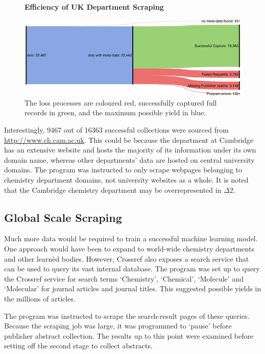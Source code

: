 \begin{figure}[H]
    \centering
    \textbf{Efficiency of UK Department Scraping}\par\medskip
    \includegraphics[width=\textwidth]{Data_Acquisition/uk_sankey.png}
    \caption[Efficiency of UK Department Scraping]{The loss processes are coloured red, successfully captured full records in green, and the maximum possible yield in blue.}
     \label{fig:UKSANK}
\end{figure}

Interestingly, 9467 out of 16363 successful collections were sourced from \url{http://www.ch.cam.ac.uk}. This could be because the department at Cambridge has an extensive website and  hosts the majority of its information under its own domain name, whereas other departments' data are hosted on central university domains. The program was instructed to only scrape webpages belonging to chemistry department domains, not university websites as a whole. It is noted that the Cambridge chemistry department may be overrepresented in $\Delta2$.

\subsection{Global Scale Scraping}
\label{sec:CROSSREFSCRAPE}
Much more data would be required to train a successful machine learning model. One approach would have been to expand to world-wide chemistry departments and other learn\`{e}d bodies. However, Crossref also exposes a search service that can be used to query its vast internal database. The program was set up to query the Crossref service for search terms `Chemistry', `Chemical', `Molecule' and `Molecular' for journal articles and journal titles. This suggested possible yields in the millions of articles. 

The program was instructed to scrape the search-result pages of these queries. Because the scraping job was large, it was programmed to `pause' before publisher abstract collection. The results up to this point were examined before setting off the second stage to collect abstracts.

